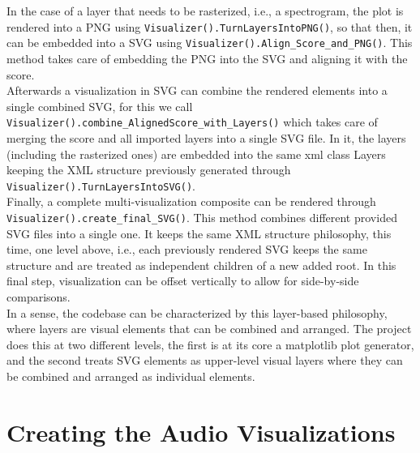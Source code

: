 \noindent In the case of a layer that needs to be rasterized, i.e., a spectrogram, the plot is rendered into a PNG using \texttt{Visualizer().TurnLayersIntoPNG()}, so that then, it can be embedded into a SVG using \texttt{Visualizer().Align\_Score\_and\_PNG()}. This method takes care of embedding the PNG into the SVG and aligning it with the score.\\

\noindent Afterwards a visualization in SVG can combine the rendered elements into a single combined SVG, for this we call \texttt{Visualizer().combine\_AlignedScore\_with\_Layers()} which takes care of merging the score and all imported layers into a single SVG file. In it, the layers (including the rasterized ones) are embedded into the same xml class Layers keeping the XML structure previously generated through \texttt{Visualizer().TurnLayersIntoSVG()}.\\ 

\noindent Finally, a complete multi-visualization composite can be rendered through \\ \texttt{Visualizer().create\_final\_SVG()}. This method combines different provided SVG files into a single one. It keeps the same XML structure philosophy, this time, one level above, i.e., each previously rendered SVG keeps the same structure and are treated as independent children of a new added root. In this final step, visualization can be offset vertically to allow for side-by-side comparisons.\\

\noindent In a sense, the codebase can be characterized by this layer-based philosophy, where layers are visual elements that can be combined and arranged. The project does this at two different levels, the first is at its core a matplotlib plot generator, and the second treats SVG elements as upper-level visual layers where they can be combined and arranged as individual elements. 

\section{Creating the Audio Visualizations}


